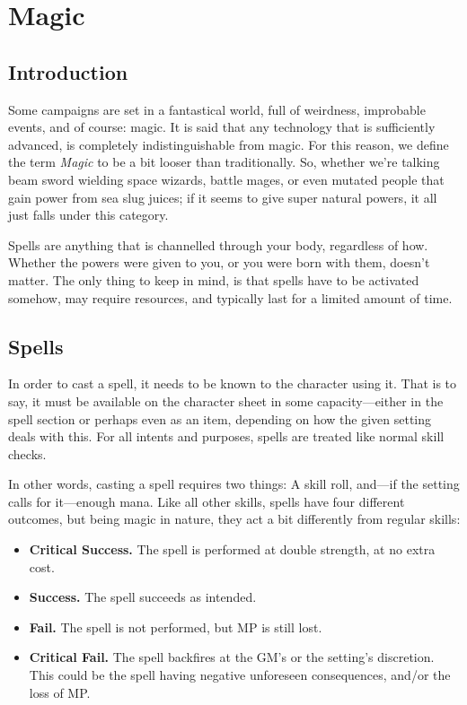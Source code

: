\chapter{Magic} \label{chap:magic}
\section{Introduction}
Some campaigns are set in a fantastical world, full of weirdness, improbable events, and of course: magic.
It is said that any technology that is sufficiently advanced, is completely indistinguishable from magic.
For this reason, we define the term \textit{Magic} to be a bit looser than traditionally.
So, whether we're talking beam sword wielding space wizards, battle mages, or even mutated people that gain power from sea slug juices;
if it seems to give super natural powers, it all just falls under this category.

\begin{note} 
  Spells are anything that is channelled through your body, regardless of how.
  Whether the powers were given to you, or you were born with them, doesn't matter.
  The only thing to keep in mind, is that spells have to be activated somehow, may require resources, and typically last for a limited amount of time.
\end{note}

\section{Spells}
In order to cast a spell, it needs to be known to the character using it.
That is to say, it must be available on the character sheet in some capacity---either in the spell section or perhaps even as an item, depending on how the given setting deals with this.
For all intents and purposes, spells are treated like normal skill checks.

In other words, casting a spell requires two things: A skill roll, and---if the setting calls for it---enough mana.
Like all other skills, spells have four different outcomes, but being magic in nature, they act a bit differently from regular skills:
\begin{itemize}
  \item \textbf{Critical Success.} The spell is performed at double strength, at no extra cost.
  \item \textbf{Success.} The spell succeeds as intended.
  \item \textbf{Fail.} The spell is not performed, but MP is still lost.
  \item \textbf{Critical Fail.} The spell backfires at the GM's or the setting's discretion.
\\This could be the spell having negative unforeseen consequences, and/or the loss of MP.
\end{itemize}


